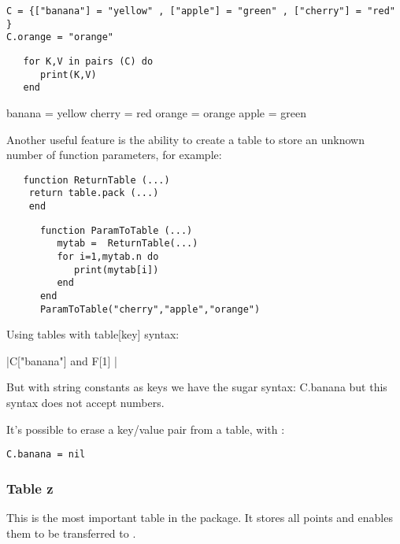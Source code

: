 \begin{mybox}
\begin{verbatim}
C = {["banana"] = "yellow" , ["apple"] = "green" , ["cherry"] = "red" }
C.orange = "orange"\end{verbatim}
\end{mybox}

\begin{mybox}
\begin{verbatim}
   for K,V in pairs (C) do
      print(K,V)
   end\end{verbatim}
\end{mybox}

banana = yellow
cherry = red
orange = orange
apple  = green

Another useful feature is the ability to create a table to store an unknown number of function parameters, for example:

\begin{mybox}
\begin{verbatim}
   function ReturnTable (...)
    return table.pack (...) 
    end \end{verbatim}
\end{mybox}

\begin{mybox}
   \begin{verbatim}
      function ParamToTable (...)
         mytab =  ReturnTable(...)
         for i=1,mytab.n do
            print(mytab[i])
         end
      end
      ParamToTable("cherry","apple","orange")  \end{verbatim}
\end{mybox}


Using tables with table[key] syntax:

|C["banana"] and F[1]  |

But with  string constants as keys we have the sugar syntax:
C.banana but this syntax does not accept numbers.

It's possible to erase a key/value pair from a table, with :

\begin{mybox}
\begin{verbatim}
C.banana = nil \end{verbatim}
\end{mybox}

\subsubsection{Table z} %
\label{ssub:table_z}
This is the most important table in the package. It stores all points and enables them to be transferred to \TIKZ{}.

